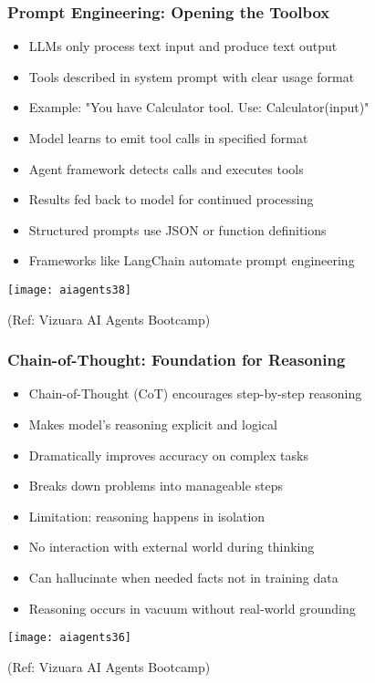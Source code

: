 \begin{frame}[fragile]\frametitle{Prompt Engineering: Opening the Toolbox}
      \begin{itemize}
	  \item LLMs only process text input and produce text output
	  \item Tools described in system prompt with clear usage format
	  \item Example: "You have Calculator tool. Use: Calculator(input)"
	  \item Model learns to emit tool calls in specified format
	  \item Agent framework detects calls and executes tools
	  \item Results fed back to model for continued processing
	  \item Structured prompts use JSON or function definitions
	  \item Frameworks like LangChain automate prompt engineering
	  \end{itemize}
	  
		\begin{center}
		\texttt{[image: aiagents38]}

		{\tiny (Ref: Vizuara AI Agents Bootcamp)}

		\end{center}		  
\end{frame}

\begin{frame}[fragile]\frametitle{Chain-of-Thought: Foundation for Reasoning}
      \begin{itemize}
	  \item Chain-of-Thought (CoT) encourages step-by-step reasoning
	  \item Makes model's reasoning explicit and logical
	  \item Dramatically improves accuracy on complex tasks
	  \item Breaks down problems into manageable steps
	  \item Limitation: reasoning happens in isolation
	  \item No interaction with external world during thinking
	  \item Can hallucinate when needed facts not in training data
	  \item Reasoning occurs in vacuum without real-world grounding
	  \end{itemize}
	  
		\begin{center}
		\texttt{[image: aiagents36]}

		{\tiny (Ref: Vizuara AI Agents Bootcamp)}

		\end{center}	  
\end{frame}

